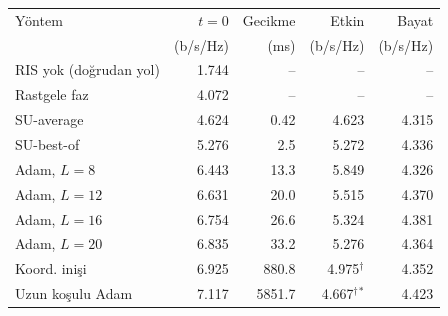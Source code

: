 \begin{tabular}{lrrrr}
\toprule
Yöntem & $t{=}0$ & Gecikme & Etkin & Bayat \\
 & (b/s/Hz) & (ms) & (b/s/Hz) & (b/s/Hz) \\
\midrule
RIS yok (doğrudan yol) & 1.744 & -- & -- & -- \\
Rastgele faz & 4.072 & -- & -- & -- \\
SU-average & 4.624 & 0.42 & 4.623 & 4.315 \\
SU-best-of & 5.276 & 2.5 & 5.272 & 4.336 \\
Adam, $L=8$ & 6.443 & 13.3 & 5.849 & 4.326 \\
Adam, $L=12$ & 6.631 & 20.0 & 5.515 & 4.370 \\
Adam, $L=16$ & 6.754 & 26.6 & 5.324 & 4.381 \\
Adam, $L=20$ & 6.835 & 33.2 & 5.276 & 4.364 \\
Koord. inişi & 6.925 & 880.8 & 4.975$^\dagger$ & 4.352 \\
Uzun koşulu Adam & 7.117 & 5851.7 & 4.667$^\dagger$$^\ast$ & 4.423 \\
\bottomrule
\end{tabular}
